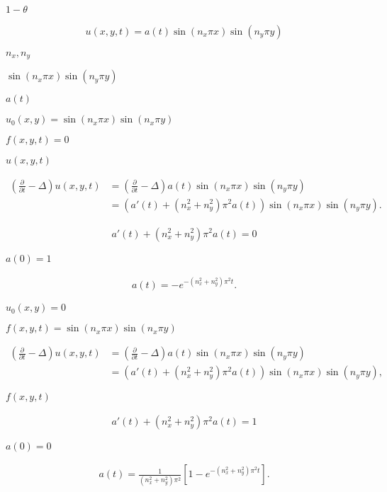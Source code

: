 \documentclass{article}
\begin{document}
$1-\theta$
\pagebreak

\begin{align*} u(x,y,t) = a(t) \sin(n_x \pi x) \sin(n_y \pi y) \end{align*}
\pagebreak

$n_x,n_y$
\pagebreak

$\sin(n_x \pi x) \sin(n_y \pi y)$
\pagebreak

$a(t)$
\pagebreak

$u_0(x,y)=\sin(n_x \pi x) \sin(n_x \pi y)$
\pagebreak

$f(x,y,t)=0$
\pagebreak

$u(x,y,t)$
\pagebreak

\begin{align*} \left(\frac{\partial}{\partial t} -\Delta\right) u(x,y,t) &= \left(\frac{\partial}{\partial t} -\Delta\right) a(t) \sin(n_x \pi x) \sin(n_y \pi y) \\ &= \left(a'(t) + (n_x^2+n_y^2)\pi^2 a(t) \right) \sin(n_x \pi x) \sin(n_y \pi y). \end{align*}
\pagebreak

\begin{align*} a'(t) + (n_x^2+n_y^2)\pi^2 a(t) = 0 \end{align*}
\pagebreak

$a(0)=1$
\pagebreak

\begin{align*} a(t) = - e^{-(n_x^2+n_y^2)\pi^2 t}. \end{align*}
\pagebreak

$u_0(x,y)=0$
\pagebreak

$f(x,y,t)=\sin(n_x \pi x) \sin(n_x \pi y)$
\pagebreak

\begin{align*} \left(\frac{\partial}{\partial t} -\Delta\right) u(x,y,t) &= \left(\frac{\partial}{\partial t} -\Delta\right) a(t) \sin(n_x \pi x) \sin(n_y \pi y) \\ &= \left(a'(t) + (n_x^2+n_y^2)\pi^2 a(t) \right) \sin(n_x \pi x) \sin(n_y \pi y), \end{align*}
\pagebreak

$f(x,y,t)$
\pagebreak

\begin{align*} a'(t) + (n_x^2+n_y^2)\pi^2 a(t) = 1 \end{align*}
\pagebreak

$a(0)=0$
\pagebreak

\begin{align*} a(t) = \frac{1}{(n_x^2+n_y^2)\pi^2} \left[ 1 - e^{-(n_x^2+n_y^2)\pi^2 t} \right]. \end{align*}
\pagebreak
\end{document}
